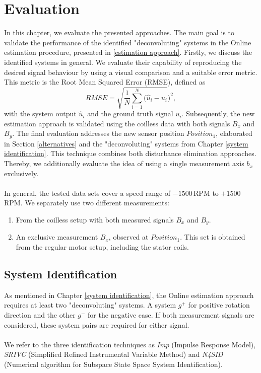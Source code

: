 \documentclass[english]{isasthesis}
\begin{document}
  	\chapter{Evaluation}\label{evaluation}
  	In this chapter, we evaluate the presented approaches. The main goal is to validate the performance of the identified "deconvoluting" systems in the Online estimation procedure, presented in \ref{estimation approach}. Firstly, we discuss the identified systems in general. We evaluate their capability of reproducing the desired signal behaviour by using a visual comparison and a suitable error metric. This metric is the Root Mean Squared Error (RMSE), defined as   
  		\begin{equation}
  		RMSE = \sqrt{\frac{1}{N}\sum_{i=1}^N(\hat{u}_i - u_i})^2, \label{eq:rmse}
  		\end{equation}
  		with the system output $\hat{u}_i$ and the ground truth signal $u_i$. Subsequently, the new estimation approach is validated using the coilless data with both signals $B_x$ and $B_y$. The final evaluation addresses the new sensor position $Position_1$, elaborated in Section \ref{alternatives} and the "deconvoluting" systems from Chapter \ref{system identification}. This technique combines both disturbance elimination approaches. Thereby, we additionally evaluate the idea of using a single measurement axis $b_x$ exclusively. \\\\
  		In general, the tested data sets cover a speed range of $-1500\,$RPM to $+1500\,$RPM. We separately use two different measurements: 
  		\begin{enumerate}
  			\item From the coilless setup with both measured signals $B_x$ and $B_y$.
  			\item An exclusive measurement $B_x$, observed at $Position_1$. This set is obtained from the regular motor setup, including the stator coils. 
  		\end{enumerate}
  		\section{System Identification} \label{evaluation sid}
  		As mentioned in Chapter \ref{system identification}, the Online estimation approach requires at least two "deconvoluting" systems. A system $g^+$ for positive rotation direction and the other $g^-$ for the negative case. If both measurement signals are considered,  these system pairs are required for either signal. \\\\We refer to the three identification techniques as \textit{Imp} (Impulse Response Model), \textit{SRIVC} (Simplified Refined Instrumental Variable Method) and \textit{N4SID} (Numerical algorithm for Subspace State Space System Identification).
\end{document}
